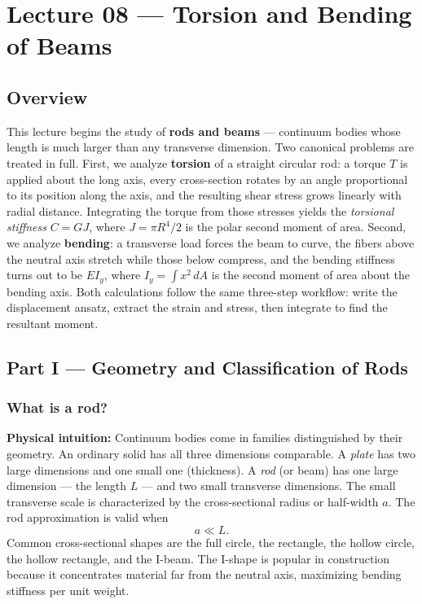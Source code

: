 \documentclass[../main.tex]{subfiles}
\begin{document}
\section{Lecture 08 — Torsion and Bending of Beams}\label{sec:lec08}
\date{May 4, 2026}

\subsection*{Overview}
This lecture begins the study of \textbf{rods and beams} — continuum bodies whose length is much larger than any transverse dimension. Two canonical problems are treated in full. First, we analyze \textbf{torsion} of a straight circular rod: a torque $T$ is applied about the long axis, every cross-section rotates by an angle proportional to its position along the axis, and the resulting shear stress grows linearly with radial distance. Integrating the torque from those stresses yields the \emph{torsional stiffness} $C = GJ$, where $J = \pi R^4/2$ is the polar second moment of area. Second, we analyze \textbf{bending}: a transverse load forces the beam to curve, the fibers above the neutral axis stretch while those below compress, and the bending stiffness turns out to be $EI_y$, where $I_y = \int x^2 \, dA$ is the second moment of area about the bending axis. Both calculations follow the same three-step workflow: write the displacement ansatz, extract the strain and stress, then integrate to find the resultant moment.

\subsection*{Part I — Geometry and Classification of Rods}

\subsubsection*{What is a rod?}

\noindent\textbf{Physical intuition:} Continuum bodies come in families distinguished by their geometry. An ordinary solid has all three dimensions comparable. A \emph{plate} has two large dimensions and one small one (thickness). A \emph{rod} (or beam) has one large dimension — the length $L$ — and two small transverse dimensions. The small transverse scale is characterized by the cross-sectional radius or half-width $a$. The rod approximation is valid when
\[
    a \ll L.
\]
Common cross-sectional shapes are the full circle, the rectangle, the hollow circle, the hollow rectangle, and the I-beam. The I-shape is popular in construction because it concentrates material far from the neutral axis, maximizing bending stiffness per unit weight.
\end{document}
